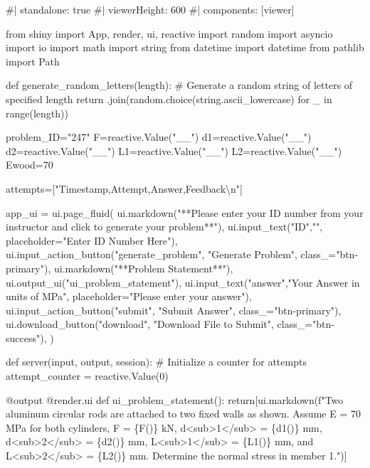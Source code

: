 \documentclass[
  letterpaper,
  DIV=11,
  numbers=noendperiod]{scrreprt}
\newenvironment{Shaded}{\begin{snugshade}}{\end{snugshade}}
\newcommand{\NormalTok}[1]{\textcolor[rgb]{0.00,0.23,0.31}{#1}}
\begin{document}
\begin{Shaded}
\begin{Highlighting}[]
\NormalTok{\#| standalone: true}
\NormalTok{\#| viewerHeight: 600}
\NormalTok{\#| components: [viewer]}

\NormalTok{from shiny import App, render, ui, reactive}
\NormalTok{import random}
\NormalTok{import asyncio}
\NormalTok{import io}
\NormalTok{import math}
\NormalTok{import string}
\NormalTok{from datetime import datetime}
\NormalTok{from pathlib import Path}

\NormalTok{def generate\_random\_letters(length):}
\NormalTok{    \# Generate a random string of letters of specified length}
\NormalTok{    return \textquotesingle{}\textquotesingle{}.join(random.choice(string.ascii\_lowercase) for \_ in range(length)) }

\NormalTok{problem\_ID="247"}
\NormalTok{F=reactive.Value("\_\_")}
\NormalTok{d1=reactive.Value("\_\_")}
\NormalTok{d2=reactive.Value("\_\_")}
\NormalTok{L1=reactive.Value("\_\_")}
\NormalTok{L2=reactive.Value("\_\_")}
\NormalTok{Ewood=70}

\NormalTok{attempts=["Timestamp,Attempt,Answer,Feedback\textbackslash{}n"]}

\NormalTok{app\_ui = ui.page\_fluid(}
\NormalTok{    ui.markdown("**Please enter your ID number from your instructor and click to generate your problem**"),}
\NormalTok{    ui.input\_text("ID","", placeholder="Enter ID Number Here"),}
\NormalTok{    ui.input\_action\_button("generate\_problem", "Generate Problem", class\_="btn{-}primary"),}
\NormalTok{    ui.markdown("**Problem Statement**"),}
\NormalTok{    ui.output\_ui("ui\_problem\_statement"),}
\NormalTok{    ui.input\_text("answer","Your Answer in units of MPa", placeholder="Please enter your answer"),}
\NormalTok{    ui.input\_action\_button("submit", "Submit Answer", class\_="btn{-}primary"),}
\NormalTok{    ui.download\_button("download", "Download File to Submit", class\_="btn{-}success"),}
\NormalTok{)}


\NormalTok{def server(input, output, session):}
\NormalTok{    \# Initialize a counter for attempts}
\NormalTok{    attempt\_counter = reactive.Value(0)}

\NormalTok{    @output}
\NormalTok{    @render.ui}
\NormalTok{    def ui\_problem\_statement():}
\NormalTok{        return[ui.markdown(f"Two aluminum circular rods are attached to two fixed walls as shown. Assume E = 70 MPa for both cylinders, F = \{F()\} kN, d\textless{}sub\textgreater{}1\textless{}/sub\textgreater{} = \{d1()\} mm, d\textless{}sub\textgreater{}2\textless{}/sub\textgreater{}  = \{d2()\} mm, L\textless{}sub\textgreater{}1\textless{}/sub\textgreater{}  = \{L1()\} mm, and L\textless{}sub\textgreater{}2\textless{}/sub\textgreater{}  = \{L2()\} mm. Determine the normal stress in member 1.")]}
    

\end{Highlighting}
\end{Shaded}
\end{document}
